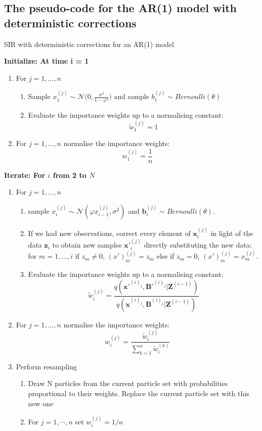 \documentclass[11pt,a4paper]{article}
\renewcommand{\vec}[1]{\mathbf{#1}}
\begin{document}
\subsection{The pseudo-code for the AR(1) model with deterministic corrections}

\begin{algorithm}[H]
\caption{SIR with deterministic corrections for an AR(1) model}\label{euclid}
 \begin{algorithmic}

 \State  \bf{Initialize:} \normalfont At time i = 1
            
\begin{enumerate}
	\item For $j = 1, \dots , n$
	\begin{enumerate}
		\item Sample $x_{1}^{(j)} \sim \mathcal{N} \Bigg (0, \frac{\sigma^2}{1- \varphi^2} \Bigg)$ and sample $b_1^{(j)} \sim Bernoulli(\theta)$
		\item Evaluate the importance weights up to a normalising constant:
		\[
		\tilde{w}^{(j)}_{1} = 1
		\]
	\end{enumerate}
	\item For $j = 1, \dots , n$ normalise the importance weights: 
	\[
	w^{(j)}_{1} = \frac{1}{n}
	\]
\end{enumerate}

 \State  \bf{Iterate:} \normalfont For $i$ from 2 to $N$

\begin{enumerate}
	\item For $j = 1, \dots , n$
	\begin{enumerate}
  		\item sample $x_{i}^{(j)} \sim \mathcal{N} (\varphi x_{i-1}^{(j)}, \sigma^{2})$ and $\vec{b}_i^{(j)} \sim Bernoulli(\theta)$.
		\item {If we had new observations, correct every element of $\vec{x}_{i}^{(j)}$ in light of the data $\vec{z}_{i}$ to obtain new samples $\vec{x'}_{i}^{(j)}$ directly substituting the new data: for $m = 1, \dots ,i$ if $z_{m} \neq 0$, $(x')_m^{(j)} = z_{m}$ else if $z_{m} = 0$, $(x')_m^{(j)} = x_m^{(j)}$.}
		\item Evaluate the importance weights up to a normalising constant:
		\[
		\tilde{w}^{(j)}_{i} = \frac{q(\vec{x'}^{(i)_j}, \vec{B'}^{(i)_j} | \vec{Z}^{(i-1)})}{q(\vec{x}^{(i)_j}, \vec{B}^{(i)_j} | \vec{Z}^{(i-1)})}
		\]
	\end{enumerate}
	\item For $j = 1, \dots , n$ normalise the importance weights:
	\[
	w^{(j)}_{i} = \frac{\tilde{w}^{(j)}_{i}}{\sum_{k=1}^{n}\tilde{w}^{(k)}_{i}}
	\]
	\item Perform resampling
	\begin{enumerate}
	    \item Draw N particles from the current particle set with probabilities proportional to their weights. Replace the current particle set with this new one
	    \item For $j=1,\cdots ,n$ set $w_{i}^{(j)}=1/n$
	\end{enumerate}
	


\end{enumerate}
\end{algorithmic}
\end{algorithm}
\end{document}
